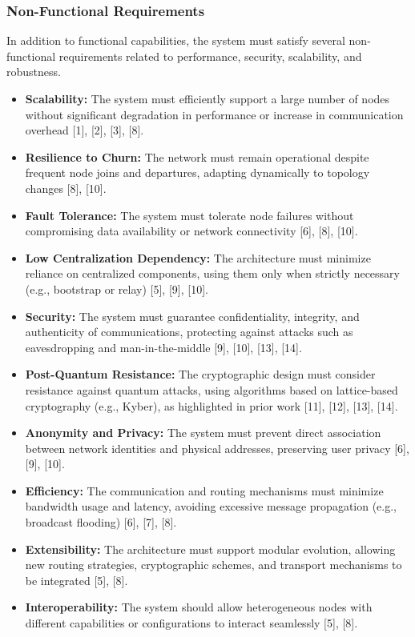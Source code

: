 \documentclass[12pt,a4paper]{article}
\begin{document}
\subsubsection{Non-Functional Requirements}

In addition to functional capabilities, the system must satisfy several non-functional requirements related to performance, security, scalability, and robustness.

\begin{itemize}

\item \textbf{Scalability:}  
The system must efficiently support a large number of nodes without significant degradation in performance or increase in communication overhead [1], [2], [3], [8].

\item \textbf{Resilience to Churn:}  
The network must remain operational despite frequent node joins and departures, adapting dynamically to topology changes [8], [10].

\item \textbf{Fault Tolerance:}  
The system must tolerate node failures without compromising data availability or network connectivity [6], [8], [10].

\item \textbf{Low Centralization Dependency:}  
The architecture must minimize reliance on centralized components, using them only when strictly necessary (e.g., bootstrap or relay) [5], [9], [10].

\item \textbf{Security:}  
The system must guarantee confidentiality, integrity, and authenticity of communications, protecting against attacks such as eavesdropping and man-in-the-middle [9], [10], [13], [14].

\item \textbf{Post-Quantum Resistance:}  
The cryptographic design must consider resistance against quantum attacks, using algorithms based on lattice-based cryptography (e.g., Kyber), as highlighted in prior work [11], [12], [13], [14].

\item \textbf{Anonymity and Privacy:}  
The system must prevent direct association between network identities and physical addresses, preserving user privacy [6], [9], [10].

\item \textbf{Efficiency:}  
The communication and routing mechanisms must minimize bandwidth usage and latency, avoiding excessive message propagation (e.g., broadcast flooding) [6], [7], [8].

\item \textbf{Extensibility:}  
The architecture must support modular evolution, allowing new routing strategies, cryptographic schemes, and transport mechanisms to be integrated [5], [8].

\item \textbf{Interoperability:}  
The system should allow heterogeneous nodes with different capabilities or configurations to interact seamlessly [5], [8].

\end{itemize}
\end{document}
